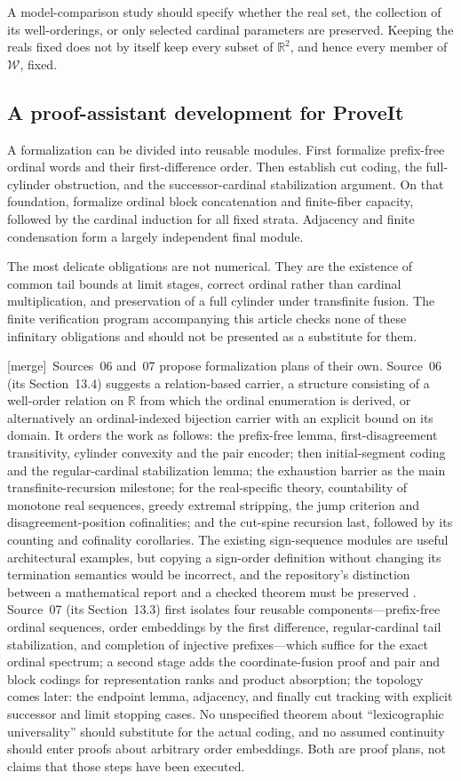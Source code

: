 \documentclass[11pt,a4paper]{article}
\theoremstyle{definition}
\theoremstyle{remark}
\newcommand{\R}{\mathbb R}
\newcommand{\W}{\mathcal W}
\newcommand{\merge}{\textsf{[merge]}}
\begin{document}
A model-comparison study should specify whether the real set, the
collection of its well-orderings, or only selected cardinal parameters are
preserved. Keeping the reals fixed does not by itself keep every subset of
$\R^2$, and hence every member of $\W$, fixed.

\subsection{A proof-assistant development for ProveIt}
A formalization can be divided into reusable modules. First formalize
prefix-free ordinal words and their first-difference order. Then establish
cut coding, the full-cylinder obstruction, and the successor-cardinal
stabilization argument. On that foundation, formalize ordinal block
concatenation and finite-fiber capacity, followed by the cardinal induction
for all fixed strata. Adjacency and finite condensation form a largely
independent final module.

The most delicate obligations are not numerical. They are the existence of
common tail bounds at limit stages, correct ordinal rather than cardinal
multiplication, and preservation of a full cylinder under transfinite
fusion. The finite verification program accompanying this article checks
none of these infinitary obligations and should not be presented as a
substitute for them.

\merge\ Sources~06 and~07 propose formalization plans of their own.
Source~06 (its Section~13.4) suggests a relation-based carrier, a structure
consisting of a well-order relation on $\R$ from which the ordinal enumeration
is derived, or alternatively an ordinal-indexed bijection carrier with an
explicit bound on its domain. It orders the work as follows: the prefix-free
lemma, first-disagreement transitivity, cylinder convexity and the pair
encoder; then initial-segment coding and the regular-cardinal stabilization
lemma; the exhaustion barrier as the main transfinite-recursion milestone;
for the real-specific theory, countability of monotone real sequences, greedy
extremal stripping, the jump criterion and disagreement-position
cofinalities; and the cut-spine recursion last, followed by its counting and
cofinality corollaries. The existing sign-sequence modules are useful
architectural examples, but copying a sign-order definition without changing
its termination semantics would be incorrect, and the repository's
distinction between a mathematical report and a checked theorem must be
preserved \cite{reports,signsimplicity}. Source~07 (its Section~13.3) first
isolates four reusable components---prefix-free ordinal sequences, order
embeddings by the first difference, regular-cardinal tail stabilization, and
completion of injective prefixes---which suffice for the exact ordinal
spectrum; a second stage adds the coordinate-fusion proof and pair and block
codings for representation ranks and product absorption; the topology comes
later: the endpoint lemma, adjacency, and finally cut tracking with explicit
successor and limit stopping cases. No unspecified theorem about
``lexicographic universality'' should substitute for the actual coding, and
no assumed continuity should enter proofs about arbitrary order embeddings.
Both are proof plans, not claims that those steps have been executed.
\end{document}
